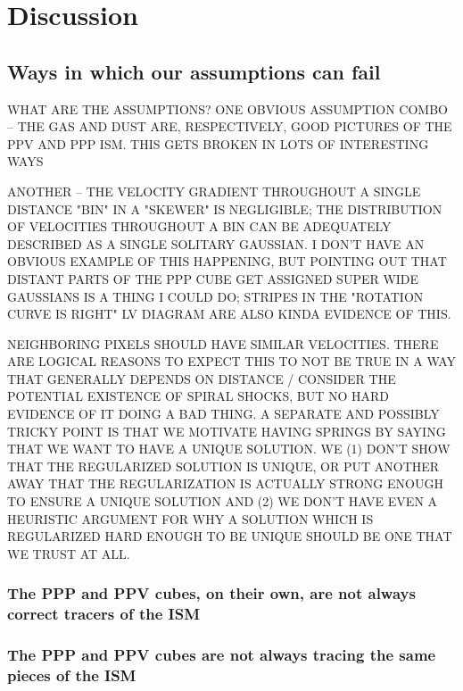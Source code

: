 \section{Discussion}
\label{sec:discussion}

\subsection{Ways in which our assumptions can fail}
\label{sec:discussion-systematics}
WHAT ARE THE ASSUMPTIONS?
ONE OBVIOUS ASSUMPTION COMBO -- THE GAS AND DUST ARE, RESPECTIVELY, GOOD PICTURES OF THE PPV AND PPP ISM. THIS GETS BROKEN IN LOTS OF INTERESTING WAYS

ANOTHER -- THE VELOCITY GRADIENT THROUGHOUT A SINGLE DISTANCE "BIN" IN A "SKEWER" IS NEGLIGIBLE; THE DISTRIBUTION OF VELOCITIES THROUGHOUT A BIN CAN BE ADEQUATELY DESCRIBED AS A SINGLE SOLITARY GAUSSIAN. I DON'T HAVE AN OBVIOUS EXAMPLE OF THIS HAPPENING, BUT POINTING OUT THAT DISTANT PARTS OF THE PPP CUBE GET ASSIGNED SUPER WIDE GAUSSIANS IS A THING I COULD DO; STRIPES IN THE "ROTATION CURVE IS RIGHT" LV DIAGRAM ARE ALSO KINDA EVIDENCE OF THIS.

NEIGHBORING PIXELS SHOULD HAVE SIMILAR VELOCITIES. THERE ARE LOGICAL REASONS TO EXPECT THIS TO NOT BE TRUE IN A WAY THAT GENERALLY DEPENDS ON DISTANCE / CONSIDER THE POTENTIAL EXISTENCE OF SPIRAL SHOCKS, BUT NO HARD EVIDENCE OF IT DOING A BAD THING. A SEPARATE AND POSSIBLY TRICKY POINT IS THAT WE MOTIVATE HAVING SPRINGS BY SAYING THAT WE WANT TO HAVE A UNIQUE SOLUTION. WE (1) DON'T SHOW THAT THE REGULARIZED SOLUTION IS UNIQUE, OR PUT ANOTHER AWAY THAT THE REGULARIZATION IS ACTUALLY STRONG ENOUGH TO ENSURE A UNIQUE SOLUTION AND (2) WE DON'T HAVE EVEN A HEURISTIC ARGUMENT FOR WHY A SOLUTION WHICH IS REGULARIZED HARD ENOUGH TO BE UNIQUE SHOULD BE ONE THAT WE TRUST AT ALL.


\subsubsection{The PPP and PPV cubes, on their own, are not always correct tracers of the ISM}


\subsubsection{The PPP and PPV cubes are not always tracing the same pieces of the ISM}


\subsubsection{}



